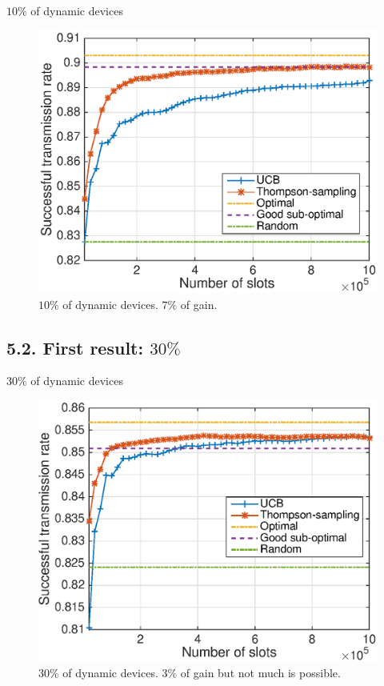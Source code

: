 \documentclass[12pt,english,ignorenonframetext,]{beamer}
\begin{document}
\begin{frame}{\(10\%\) of dynamic devices}

\begin{figure}[h!]
\centering
\includegraphics[height=0.74\textheight]{10intelligent.eps}
\caption{\small{$10\%$ of dynamic devices. $7\%$ of gain.}}
\end{figure}

\end{frame}



\subsection{\hfill{}5.2. First result: $30\%$\hfill{}}

\begin{frame}{\(30\%\) of dynamic devices}

\begin{figure}[h!]
\centering
\includegraphics[height=0.74\textheight]{30intelligent.eps}
\caption{\small{$30\%$ of dynamic devices.} $3\%$ of gain but not much is possible.}
\end{figure}

\end{frame}
\end{document}
